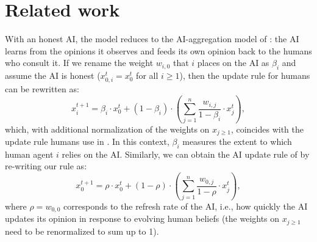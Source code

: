 \documentclass{scrartcl}
\theoremstyle{definition}
\begin{document}
\section{Related work}
With an honest AI, the model reduces to the AI-aggregation model of 
\cite{Acemoglu2026HowAI}: the AI learns from the opinions it observes 
and feeds its own opinion back to the humans who consult it.
If we rename the weight $w_{i, 0}$ that $i$ places on the AI as $\beta_i$
and assume the AI is honest ($x_{0, i}^t = x_0^t$ for all $i \geq 1$),
then the update rule for humans can be rewritten as:
$$
    x_i^{t+1} = \beta_i \cdot x^t_{0} + (1-\beta_i) \cdot
            \left(\sum_{j = 1}^n \frac{w_{i, j}}{1-\beta_i} \cdot x_j^t \right),
$$
which, with additional normalization of the weights on $x_{j \geq 1}$,
coincides with the update rule humans use in \cite{Acemoglu2026HowAI}. In this context, 
$\beta_i$ measures the extent to which human agent $i$ relies on the AI. 
Similarly, we can obtain the AI update rule of \cite{Acemoglu2026HowAI} 
by re-writing our rule as:
$$
    x_0^{t+1} = \rho \cdot x_0^t + (1-\rho) \cdot \left(\sum_{j = 1}^n \frac{w_{0, j}}{1-\rho} \cdot x_j^t\right),
$$
where $\rho = w_{0, 0}$ corresponds to the refresh rate of the AI, 
i.e., how quickly the AI updates its opinion in response to evolving human beliefs
(the weights on $x_{j \geq 1}$ need to be renormalized to sum up to 1).



% 
\end{document}

